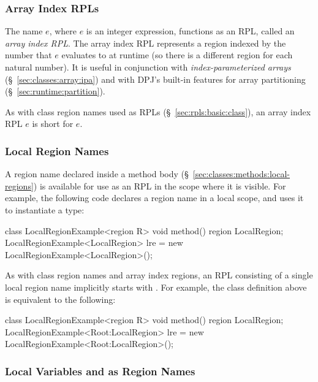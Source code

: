 \subsubsection{Array Index RPLs%
\label{sec:rpls:basic:array}}

The name \kwd{[}$e$\kwd{]}, where $e$ is an integer expression,
functions as an RPL, called an \emph{array index RPL}.  The array
index RPL represents a region indexed by the number that $e$
evaluates to at runtime (so there is a different region for each
natural number).  It is useful in conjunction with
\emph{index-parameterized arrays} (\S~\ref{sec:classes:array:ipa}) and
with DPJ's built-in features for array partitioning
(\S~\ref{sec:runtime:partition}).

As with class region names used as RPLs
(\S~\ref{sec:rpls:basic:class}), an array index RPL \kwd{[}$e$\kwd{]}
is short for \kwd{Root:[}$e$\kwd{]}.

\subsubsection{Local Region Names%
\label{sec:rpls:basic:local}}


A region name declared inside a method body
(\S~\ref{sec:classes:methods:local-regions}) is available for use as
an RPL in the scope where it is visible.  For example, the following
code declares a region name  in a local scope, and
uses it to instantiate a type:
%
\begin{dpjlisting}
class LocalRegionExample<region R> {
    void method() {
        region LocalRegion;
        LocalRegionExample<LocalRegion> lre = 
          new LocalRegionExample<LocalRegion>();
    }
}
\end{dpjlisting}
%

As with class region names and array index regions, an RPL consisting
of a single local region name implicitly starts with .  For
example, the class definition above is equivalent to the following:
%
\begin{dpjlisting}
class LocalRegionExample<region R> {
    void method() {
        region LocalRegion;
        LocalRegionExample<Root:LocalRegion> lre = 
          new LocalRegionExample<Root:LocalRegion>();
    }
}
\end{dpjlisting}
%


\subsubsection{ Local Variables and  as Region Names%
\label{sec:rpls:basic:var}}

